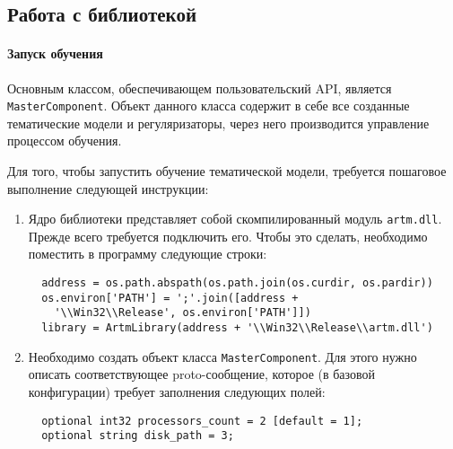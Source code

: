 \subsection{Работа с библиотекой}

\paragraph{Запуск обучения} Основным классом, обеспечивающем пользовательский API, является \verb|MasterComponent|. Объект данного класса содержит в себе все созданные тематические модели и регуляризаторы, через него производится управление процессом обучения. 

Для того, чтобы запустить обучение тематической модели, требуется пошаговое выполнение следующей инструкции:

\begin{enumerate}
	\item Ядро библиотеки представляет собой скомпилированный модуль \verb|artm.dll|. Прежде всего требуется подключить его. Чтобы это сделать, необходимо поместить в программу следующие строки:
	
	\vspace{5pt}
	
	\verb|  address = os.path.abspath(os.path.join(os.curdir, os.pardir))| \\
	\verb|  os.environ['PATH'] = ';'.join([address + | \\
	\verb|    '\\Win32\\Release', os.environ['PATH']])| \\
	\verb|  library = ArtmLibrary(address + '\\Win32\\Release\\artm.dll')|
	
	\vspace{5pt}
	
	\item Необходимо создать объект класса \verb|MasterComponent|. Для этого нужно описать соответствующее proto-сообщение, которое (в базовой конфигурации) требует заполнения следующих полей:
	
	\vspace{5pt}
	
	\verb|  optional int32 processors_count = 2 [default = 1];| \\
	\verb|  optional string disk_path = 3;|
	
	\vspace{5pt}
	

\end{enumerate}
